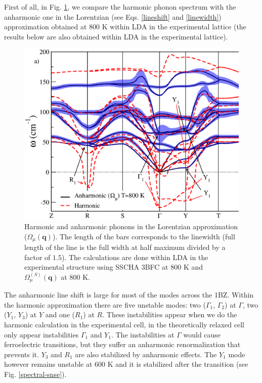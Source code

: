 First of all, in Fig. \ref{spectrum-phonon-snse}, we compare the harmonic phonon spectrum with the anharmonic one in the Lorentzian (see Eqs. \ref{lineshift} and \ref{linewidth}) approximation obtained at $800$ K within LDA in 
the experimental lattice (the results below are also obtained within LDA in the experimental lattice).
\begin{figure}[h]
\includegraphics[width=\linewidth]{Figures/spectrum-snse.eps}
\caption[Phonons in the Lorentzian approximation in SnSe.]{Harmonic and anharmonic phonons in the Lorentzian approximation ($\Omega_{\mu}(\mathbf{q})$). The length of the bars corresponds to the linewidth (full length of the line 
is the full width at half maximum divided by a factor of $1.5$). The calculations are done within LDA in the experimental structure using SSCHA 3BFC at $800$ K and $\Omega^{(S)}_{\mu}(\mathbf{q})$ at $800$ K.}
\label{spectrum-phonon-snse}
\end{figure}
The anharmonic line shift is large for most of the modes across the 1BZ. Within the harmonic approximation there are five unstable modes: two ($\Gamma_{1}$, $\Gamma_{2}$) at $\Gamma$, two ($Y_{1}$, $Y_{3}$) at $Y$ and one 
($R_{1}$) at $R$. These instabilities appear when we do the harmonic calculation in the experimental cell, in the theoretically relaxed cell only appear instabilities $\Gamma_{1}$ and $Y_{1}$. The instabilities at $\Gamma$ would cause ferroelectric transitions\cite{skelton2016anharmonicity,hong2016electronic}, but they suffer an anharmonic renormalization that prevents it. $Y_{3}$ and $R_{1}$ are also stabilized by anharmonic effects. The $Y_{1}$ mode however remains unstable at $600$ K and it is stabilized after the transition (see Fig. \ref{spectral-snse}). \\

